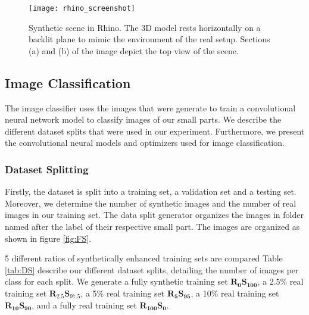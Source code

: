 \begin{figure}[H]
\centering
  \texttt{[image: rhino\_screenshot]}
\caption{Synthetic scene in Rhino. The 3D model rests horizontally on a backlit plane to mimic the environment of the real setup. Sections (a) and (b) of the image depict the top view of the scene.}
\label{fig:RhinoScreenshot}
\end{figure}

\subsection{Image Classification}

The image classifier uses the images that were generate to train a convolutional neural network model to classify images of our small parts. We describe the different dataset splits that were used in our experiment. Furthermore, we present the convolutional neural models and optimizers used for image classification.

\subsubsection{Dataset Splitting}
Firstly, the dataset is split into a training set, a validation set and a testing set. Moreover, we determine the number of synthetic images and the number of real images in our training set. The data split generator organizes the images in folder named after the label of their respective small part. The images are organized as shown in figure \ref{fig:FS}.

5 different ratios of synthetically enhanced training sets are compared Table \ref{tab:DS} describe our different dataset splits, detailing the number of images per class for each split. We generate a fully synthetic training set $\boldsymbol{R_{0}S_{100}}$, a 2.5\% real training set $\boldsymbol{R_{2.5}S_{97.5}}$, a 5\% real training set $\boldsymbol{R_{5}S_{95}}$, a 10\% real training set $\boldsymbol{R_{10}S_{90}}$, and a fully real training set $\boldsymbol{R_{100}S_{0}}$. 

